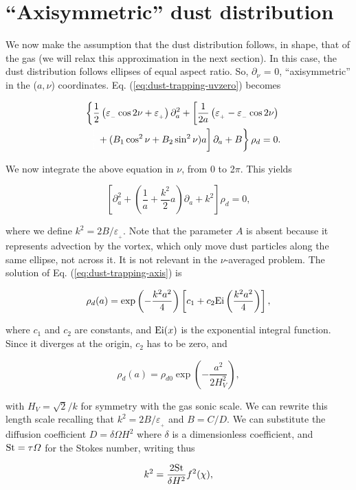 \documentclass[apj]{emulateapj}
\def\white#1{\textcolor{white}{#1}}
\newcommand{\Eq}[1]{Eq. (\ref{#1})}
\newcommand{\eq}[1]{\Eq{#1}}
\newcommand{\beq}{\begin{equation}}
\newcommand{\eeq}{\end{equation}}
\newcommand{\beqn}{\begin{eqnarray}}
\newcommand{\eeqn}{\end{eqnarray}}
\newcommand{\epsp}{\varepsilon_{_{+}}}
\newcommand{\epsm}{\varepsilon_{_{-}}}
\newcommand{\St}{{\rm St}}
\begin{document}
\section{``Axisymmetric'' dust distribution}
\label{sect:axisymmetric}

We now make the assumption that the dust distribution follows, in shape, that of
the gas (we will relax this approximation in the next section). In this case, the
dust distribution follows ellipses of equal aspect ratio. So,
$\partial_\nu$ = 0, ``axisymmetric'' in the ($a,\nu$)
coordinates. \eq{eq:dust-trapping-uvzero} becomes

\beqn
&&\left\{\frac{1}{2}\left(\epsm \cos 2\nu +\epsp\right) \partial^2_a  +  \left[\frac{1}{2a}\left( \epsp - \epsm\cos 2\nu\right) \right.\right. \nonumber\\
&&\left.\left.\white{\frac{1}{1}}+ (B_1\cos^2\nu +  B_2\sin^2\nu)a\right] \partial_a  + B\right\} \rho_d = 0. \label{eq:axi}
\eeqn

We now integrate the above equation in $\nu$, from 0 to 2$\pi$. This yields

\beq\label{eq:dust-trapping-axis}
\left[\partial^2_a  +  \left(\frac{1}{a} +  \frac{k^2}{2}a\right) \partial_a  + k^2\right]\rho_d = 0, 
\eeq

\noindent where we define $k^2=2B/\epsp$. Note that the parameter $A$
is absent because it represents advection by the vortex, which only
move dust particles along the same ellipse, not across it. It is
not relevant in the $\nu$-averaged problem. The solution of
\eq{eq:dust-trapping-axis} is 

\beq
\rho_d(a) = \exp\left(-\frac{k^2a^2}{4}\right)  \left[c_1 + c_2 {\rm
    Ei}\left(\frac{k^2a^2}{4}\right)\right],
\eeq

\noindent where $c_1$ and $c_2$ are constants, and ${\rm Ei}(x)$ is
the exponential integral function. Since it diverges at the origin, $c_2$ has to be zero, and 

\beq
\rho_d(a) = \rho_{d0} \exp\left(-\frac{a^2}{2H_V^2}\right),
\label{eq:gen_axi}
\eeq

\noindent with $H_V = \sqrt{2}/k$ for symmetry with the gas sonic scale. We can 
rewrite this length scale recalling that $k^2=2B/\epsp$ and
$B=C/D$. We can substitute the diffusion coefficient $D=\delta \varOmega H^2$ where 
$\delta$ is a dimensionless coefficient, and $\St = \tau\varOmega$ for 
the Stokes number, writing thus 

\beqn
\label{eq:k}
k^2 = \frac{2\St}{\delta H^2} f^2(\chi),
\eeqn 
\end{document}
